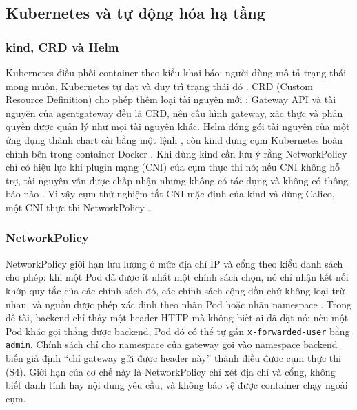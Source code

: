 \subsection{Kubernetes và tự động hóa hạ tầng}

\subsubsection{kind, CRD và Helm}

Kubernetes điều phối container theo kiểu khai báo: người dùng mô tả trạng thái mong muốn, Kubernetes tự đạt và duy trì trạng thái đó \parencite{k8s_overview}. CRD (Custom Resource Definition) cho phép thêm loại tài nguyên mới \parencite{k8s_crd}; Gateway API và tài nguyên của agentgateway đều là CRD, nên cấu hình gateway, xác thực và phân quyền được quản lý như mọi tài nguyên khác. Helm đóng gói tài nguyên của một ứng dụng thành chart cài bằng một lệnh \parencite{helm_docs}, còn kind dựng cụm Kubernetes hoàn chỉnh bên trong container Docker \parencite{kind_docs}. Khi dùng kind cần lưu ý rằng NetworkPolicy chỉ có hiệu lực khi plugin mạng (CNI) của cụm thực thi nó; nếu CNI không hỗ trợ, tài nguyên vẫn được chấp nhận nhưng không có tác dụng và không có thông báo nào \parencite{k8s_netpol}. Vì vậy cụm thử nghiệm tắt CNI mặc định của kind và dùng Calico, một CNI thực thi NetworkPolicy \parencite{calico_docs}.

\subsubsection{NetworkPolicy}\label{sec:ch3-netpol}

NetworkPolicy giới hạn lưu lượng ở mức địa chỉ IP và cổng theo kiểu danh sách cho phép: khi một Pod đã được ít nhất một chính sách chọn, nó chỉ nhận kết nối khớp quy tắc của các chính sách đó, các chính sách cộng dồn chứ không loại trừ nhau, và nguồn được phép xác định theo nhãn Pod hoặc nhãn namespace \parencite{k8s_netpol}. Trong đề tài, backend chỉ thấy một header HTTP mà không biết ai đã đặt nó; nếu một Pod khác gọi thẳng được backend, Pod đó có thể tự gán \texttt{x-forwarded-user} bằng \texttt{admin}. Chính sách chỉ cho namespace của gateway gọi vào namespace backend biến giả định ``chỉ gateway gửi được header này'' thành điều được cụm thực thi (S4). Giới hạn của cơ chế này là NetworkPolicy chỉ xét địa chỉ và cổng, không biết danh tính hay nội dung yêu cầu, và không bảo vệ được container chạy ngoài cụm.

